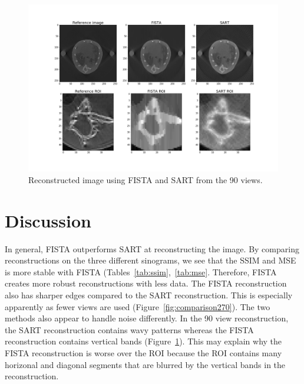 \documentclass[11pt]{article}
\begin{document}
\begin{figure}[H]
	\centering
	\includegraphics[height=0.35\paperheight]{results/comparison90.png}
	\caption{Reconstructed image using FISTA and SART from the 90 views.}
	\label{fig:comparison90}
\end{figure}

\section*{Discussion}
In general, FISTA outperforms SART at reconstructing the image. By comparing reconstructions on the three different sinograms, we see that the SSIM and MSE is more stable with FISTA (Tables~\ref{tab:ssim},~\ref{tab:mse}. Therefore, FISTA creates more robust reconstructions with less data. The FISTA reconstruction also has sharper edges compared to the SART reconstruction. This is especially apparently as fewer views are used (Figure~\ref{fig:comparison270}). The two methods also appear to handle noise differently. In the 90 view reconstruction, the SART reconstruction contains wavy patterns whereas the FISTA reconstruction contains vertical bands (Figure~\ref{fig:comparison90}). This may explain why the FISTA reconstruction is worse over the ROI because the ROI contains many horizonal and diagonal segments that are blurred by the vertical bands in the reconstruction.
\end{document}
